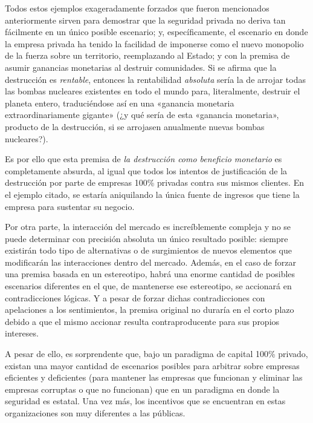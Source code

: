 \documentclass[12pt,a4paper,twoside]{book}
\begin{document}
Todos estos ejemplos exageradamente forzados que fueron mencionados anteriormente sirven para demostrar que la seguridad privada no deriva tan fácilmente en un único posible escenario; y, específicamente, el escenario en donde la empresa privada ha tenido la facilidad de imponerse como el nuevo monopolio de la fuerza sobre un territorio, reemplazando al Estado; y con la premisa de asumir ganancias monetarias al destruir comunidades. Si se afirma que la destrucción es \textit{rentable}, entonces la rentabilidad \textit{absoluta} sería la de arrojar todas las bombas nucleares existentes en todo el mundo para, literalmente, destruir el planeta entero, traduciéndose así en una «ganancia monetaria extraordinariamente gigante» (¿y qué sería de esta «ganancia monetaria», producto de la destrucción, si se arrojasen anualmente nuevas bombas nucleares?).

Es por ello que esta premisa de \textit{la destrucción como beneficio monetario} es completamente absurda, al igual que todos los intentos de justificación de la destrucción por parte de empresas 100\% privadas contra sus mismos clientes. En el ejemplo citado, se estaría aniquilando la única fuente de ingresos que tiene la empresa para sustentar su negocio.

Por otra parte, la interacción del mercado es increíblemente compleja y no se puede determinar con precisión absoluta un único resultado posible: siempre existirán todo tipo de alternativas o de surgimientos de nuevos elementos que modificarán las interacciones dentro del mercado. Además, en el caso de forzar una premisa basada en un estereotipo, habrá una enorme cantidad de posibles escenarios diferentes en el que, de mantenerse ese estereotipo, se accionará en contradicciones lógicas. Y a pesar de forzar dichas contradicciones con apelaciones a los sentimientos, la premisa original no duraría en el corto plazo debido a que el mismo accionar resulta contraproducente para sus propios intereses.

A pesar de ello, es sorprendente que, bajo un paradigma de capital 100\% privado, existan una mayor cantidad de escenarios posibles para arbitrar sobre empresas eficientes y deficientes (para mantener las empresas que funcionan y eliminar las empresas corruptas o que no funcionan) que en un paradigma en donde la seguridad es estatal. Una vez más, los incentivos que se encuentran en estas organizaciones son muy diferentes a las públicas.
\end{document}
